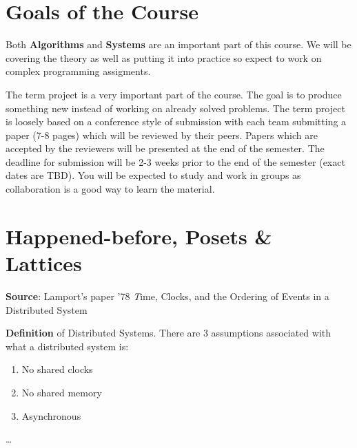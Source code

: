 \documentclass[twoside]{article}
\begin{document}
\section*{Goals of the Course}

\begin{center}
\end{center}

Both \textbf{Algorithms} and \textbf{Systems} are an important part of this course. We will be covering the theory as well as putting it into practice
so expect to work on complex programming assigments.

The term project is a very important part of the course. The goal is to produce something new instead of working on already solved problems.
The term project is loosely based on a conference style of submission with each team submitting a paper (7-8 pages) which will be reviewed by their peers. 
Papers which are accepted by the reviewers will be presented at the end of the semester. The deadline for submission will be 2-3 weeks prior to the end of
the semester (exact dates are TBD). You will be expected to study and work in groups as collaboration is a good way to learn the material.

\section*{Happened-before, Posets \& Lattices}

\textbf {Source}: Lamport's paper '78 \textit Time, Clocks, and the Ordering of Events in a Distributed System


\textbf {Definition} of Distributed Systems. 
There are 3 assumptions associated with what a distributed system is:
\begin{enumerate}
  \item No shared clocks
  \item No shared memory
  \item Asynchronous
\end{enumerate}

\begin{center}
\dots
\end{center}
\end{document}
